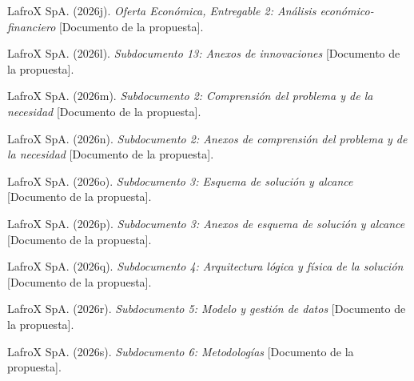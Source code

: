 \begin{list}{}{\setlength{\leftmargin}{1.27cm}\setlength{\itemindent}{-1.27cm}\setlength{\itemsep}{0.4em}\setlength{\parsep}{0pt}}
  \item \begin{samepage}LafroX SpA. (2026j). \emph{Oferta Económica, Entregable 2: Análisis económico-financiero} [Documento de la propuesta].\par\end{samepage}
  \item \begin{samepage}LafroX SpA. (2026l). \emph{Subdocumento 13: Anexos de innovaciones} [Documento de la propuesta].\par\end{samepage}
  \item \begin{samepage}LafroX SpA. (2026m). \emph{Subdocumento 2: Comprensión del problema y de la necesidad} [Documento de la propuesta].\par\end{samepage}
  \item \begin{samepage}LafroX SpA. (2026n). \emph{Subdocumento 2: Anexos de comprensión del problema y de la necesidad} [Documento de la propuesta].\par\end{samepage}
  \item \begin{samepage}LafroX SpA. (2026o). \emph{Subdocumento 3: Esquema de solución y alcance} [Documento de la propuesta].\par\end{samepage}
  \item \begin{samepage}LafroX SpA. (2026p). \emph{Subdocumento 3: Anexos de esquema de solución y alcance} [Documento de la propuesta].\par\end{samepage}
  \item \begin{samepage}LafroX SpA. (2026q). \emph{Subdocumento 4: Arquitectura lógica y física de la solución} [Documento de la propuesta].\par\end{samepage}
  \item \begin{samepage}LafroX SpA. (2026r). \emph{Subdocumento 5: Modelo y gestión de datos} [Documento de la propuesta].\par\end{samepage}
  \item \begin{samepage}LafroX SpA. (2026s). \emph{Subdocumento 6: Metodologías} [Documento de la propuesta].\par\end{samepage}

\end{list}

